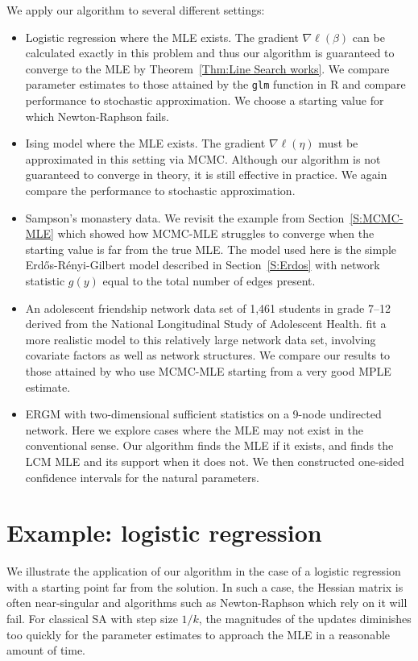 We apply our algorithm to several different settings:
\begin{itemize}
\item Logistic regression where the MLE exists.  The gradient $\nabla \ell(\beta)$ can be calculated exactly in this problem and thus our algorithm is guaranteed to converge to
the MLE by Theorem~\ref{Thm:Line Search works}.  We compare parameter estimates to those attained by the \texttt{glm} function in R and compare performance to stochastic approximation.  We choose a starting value for which Newton-Raphson fails.

\item Ising model where the MLE exists.  The gradient $\nabla \ell(\eta)$ must be approximated in this setting via MCMC.  Although our algorithm is not guaranteed to converge in theory, it is still effective in practice.  We again compare the performance to stochastic approximation.

\item Sampson's monastery data.  We revisit the example from Section~\ref{S:MCMC-MLE} which
showed how MCMC-MLE struggles to converge when the starting value is far
from the true MLE.  The model used here is the simple Erd\H{o}s-R\'{e}nyi-Gilbert model 
described in Section~\ref{S:Erdos} with network statistic $g(y)$ equal to the total number of edges present.

\item An adolescent friendship network data set of 1,461 students in grade 7--12 derived 
from the National Longitudinal Study of Adolescent Health.  \citet{statnet-tutorial}
fit a more realistic model to this relatively large network data set, involving covariate
factors as well as network structures.  We compare our results to those attained by
\citeauthor{statnet-tutorial} who use MCMC-MLE starting from a very good MPLE estimate.

\item ERGM with two-dimensional sufficient statistics on a 9-node undirected network.  
Here we explore cases where the MLE may not exist in the conventional sense.  
Our algorithm finds the MLE if it exists, and finds the LCM MLE and its support when 
it does not.  We then constructed one-sided confidence intervals for the natural parameters.
\end{itemize}

\section{Example: logistic regression} \label{S:Example:logistic}
We illustrate the application of our algorithm in the case of a logistic regression 
with a starting point far from the 
solution.  In such a case, the Hessian matrix is often near-singular and algorithms 
such as Newton-Raphson which rely 
on it will fail.  For classical SA with step size $1/k$, the magnitudes of the updates 
diminishes too quickly for 
the parameter estimates to approach the MLE in a reasonable amount of time.


